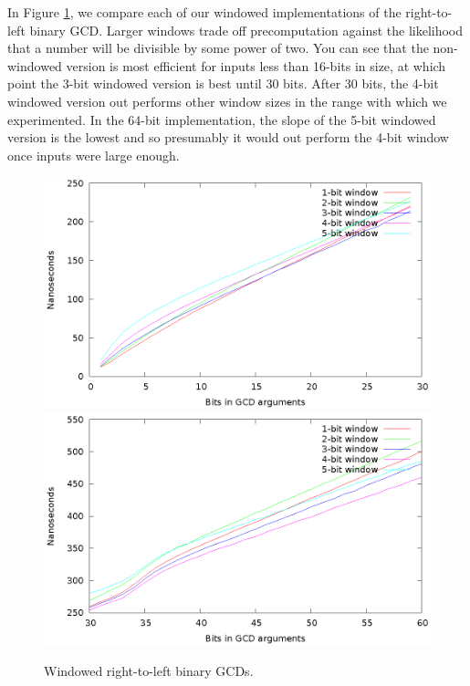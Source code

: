 \documentclass{ucalgthes1}
\theoremstyle{definition}
\begin{document}
In Figure \ref{fig:steins}, we compare each of our windowed implementations of the right-to-left binary GCD.  Larger windows trade off precomputation against the likelihood that a number will be divisible by some power of two. You can see that the non-windowed version is most efficient for inputs less than 16-bits in size, at which point the 3-bit windowed version is best until 30 bits.  After 30 bits, the 4-bit windowed version out performs other window sizes in the range with which we experimented.  In the 64-bit implementation, the slope of the 5-bit windowed version is the lowest and so presumably it would out perform the 4-bit window once inputs were large enough.
\begin{figure}[H]
\centering
\includegraphics{steins-32}
\includegraphics{steins-64}
\caption{Windowed right-to-left binary GCDs.}
\label{fig:steins}
\end{figure}
\end{document}
